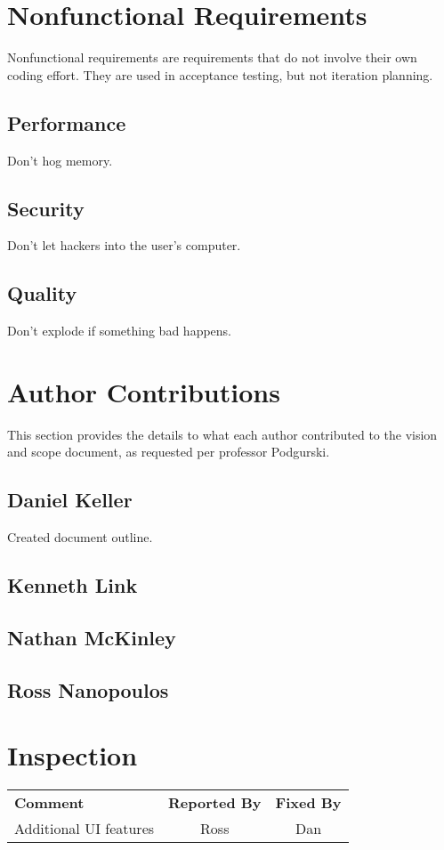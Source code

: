 \documentclass[letter]{scrartcl}
\begin{document}
\section{Nonfunctional Requirements}
Nonfunctional requirements are requirements that do not involve their own coding effort. They are used in acceptance testing, but not iteration planning. 
\subsection{Performance}
Don\rq{}t hog memory.
\subsection{Security}
Don\rq{}t let hackers into the user\rq{}s computer.
\subsection{Quality}
Don\rq{}t explode if something bad happens.

\pagebreak
\section{Author Contributions}
This section provides the details to what each author contributed to the vision and scope document, as requested per professor Podgurski.
\subsection{Daniel Keller}
Created document outline.
\subsection{Kenneth Link}
\subsection{Nathan McKinley}
\subsection{Ross Nanopoulos}

\section{Inspection}
\begin{tabularx}{\textwidth}{X c c}
\textbf{Comment} & \textbf{Reported By} & \textbf{Fixed By} \\
Additional UI features & Ross & Dan \\
\end{tabularx}
\end{document}
